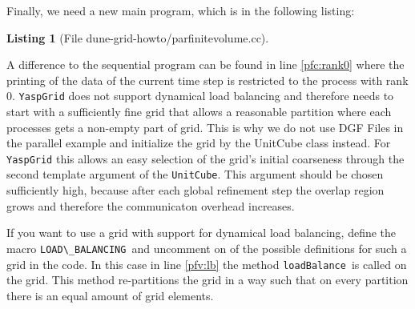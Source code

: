 \documentclass[11pt,a4paper,headinclude,footinclude,DIV16,normalheadings]{scrreprt}
\newtheorem{lst}{Listing}
\begin{document}
Finally, we need a new main program, which is in the following listing: 

\begin{lst}[File dune-grid-howto/parfinitevolume.cc] \mbox{}
\nopagebreak

\end{lst}

A difference to the sequential program can be found in line
\ref{pfc:rank0} where the printing of the data of the current time
step is restricted to the process with rank 0. 
\lstinline!YaspGrid! does not support dynamical load balancing and therefore
needs to start with a sufficiently fine grid that allows a reasonable partition
where each processes gets a non-empty part of grid. This is why we do not use
DGF Files in the parallel example and initialize the grid by the UnitCube class
instead. For \lstinline!YaspGrid! this allows an easy selection of the grid's
initial coarseness through the second template argument of the
\lstinline!UnitCube!. This argument should be chosen sufficiently high, because
after each global refinement step the overlap region grows and therefore the
communicaton overhead increases.

If you want to use a grid with support for dynamical load balancing, define the
macro \lstinline!LOAD\_BALANCING!\ and uncomment on of the possible definitions
for such a grid in the code. In this case in line \ref{pfv:lb} the method
\lstinline!loadBalance!\ is called on the grid.
This method re-partitions the grid in a way such that on every partition there
is an equal amount of grid elements.






\end{document}
